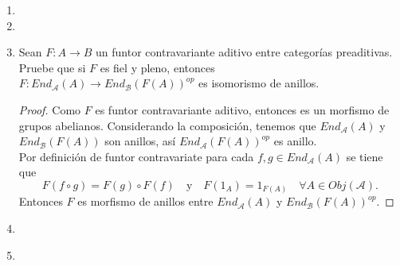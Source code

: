\documentclass{article}
\begin{document}
\begin{enumerate}[label=\textbf{Ej \arabic*.}]
en $Mod(R)\backslash A$\quad $\iff$ \quad 
{}
en $Mod(R)$.

\begin{proof}
en $Mod(R)\backslash A$\\
 $\iff \exists g^{-1}\colon f\longrightarrow f$ tal que $g^{-1}g=1_f$ y $gg^{-1}=1_f$\\
 $\iff \exists g^{-1}\colon f\longrightarrow f$ tal que $g^{-1}g=Id_B$ y $gg^{-1}=Id_B$\\
 $\iff \exists g^{-1}\in \operatorname{Hom}_R(B,B)$ tal que $g^{-1}g=Id_B$ y $gg^{-1}=Id_B$\\
$\iff$ \quad 
{}
es isomorfismo en $Mod(R)$.
\end{proof}
\item
\item
\item Sean $F\colon A\longrightarrow B$ un funtor contravariante aditivo entre categorías preaditivas. Pruebe que si $F$ es fiel y pleno, entonces\\
$F\colon End_\mathcal{A}(A) \longrightarrow End_\mathcal{B} (F(A))^{op}$ es isomorismo de anillos.
\begin{proof}
Como $F$ es funtor contravariante aditivo, entonces es un morfismo de grupos abelianos. Considerando la composición, tenemos que 
$End_ \mathcal{A}(A)$ y $End_\mathcal{B}(F(A))$ son anillos, así $End_\mathcal{A}(F(A))^{op}$ es anillo.\\

Por definición de funtor contravariate para cada $f,g\in End_ \mathcal{A}(A)$ se tiene que 
\[F(f\circ g)=F(g)\circ F(f)\quad \text{y}\quad F(1_A)=1_{F(A)}\quad \forall A\in Obj(\mathcal{A}).
\]
Entonces $F$ es morfismo de anillos entre $End_\mathcal{A}(A)$ y $End_\mathcal{B}(F(A))^{op}$.
\end{proof}

\item
\item \,\\ \,


\end{enumerate}
\end{document}
